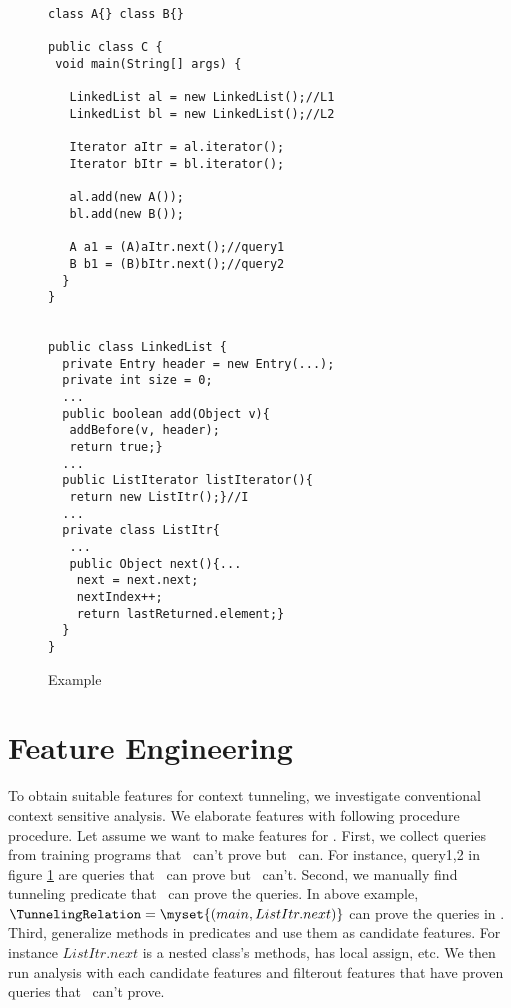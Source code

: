 \begin{figure}
\begin{multicols}{2}
\begin{lstlisting}
class A{} class B{}

public class C {
 void main(String[] args) {

   LinkedList al = new LinkedList();//L1
   LinkedList bl = new LinkedList();//L2

   Iterator aItr = al.iterator();
   Iterator bItr = bl.iterator();
		
   al.add(new A());
   bl.add(new B());
		
   A a1 = (A)aItr.next();//query1
   B b1 = (B)bItr.next();//query2
  }
}


public class LinkedList {
  private Entry header = new Entry(...);
  private int size = 0;
  ...
  public boolean add(Object v){
   addBefore(v, header);
   return true;}
  ...
  public ListIterator listIterator(){
   return new ListItr();}//I
  ...
  private class ListItr{
   ...
   public Object next(){...
    next = next.next;
    nextIndex++;
    return lastReturned.element;}
  }
}

\end{lstlisting}
\end{multicols}
\caption{Example}
\label{fig:FeatureExampleCode}
\end{figure}

\section{Feature Engineering}
To obtain suitable features for context tunneling, we investigate conventional context sensitive analysis. We elaborate features with following procedure procedure. Let assume we want to make features for \oneobjHT. First, we collect queries from training programs that \oneobjH~can't prove but \twoobjH~can. For instance, query1,2 in figure \ref{fig:FeatureExampleCode}  are queries that \twoobjH~can prove but \oneobjH~can't. Second, we manually find tunneling predicate that \oneobjHT~can prove the queries.  In above example, $\TunnelingRelation = \myset{(main, ListItr.next)}$ can prove the queries in \oneobjHT. Third, generalize methods in predicates and use them as candidate features. For instance ${ListItr.next}$ is a nested class's methods, has local assign, etc. We then run analysis with each candidate features and filterout features that have proven queries that \oneobjH~can't prove.

